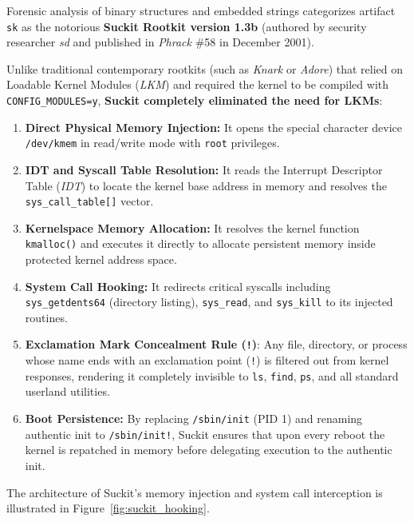 \begin{notaforense}
Forensic analysis of binary structures and embedded strings categorizes artifact \texttt{sk} as the notorious \textbf{Suckit Rootkit version 1.3b} (authored by security researcher \textit{sd} and published in \textit{Phrack} \#58 in December 2001).

Unlike traditional contemporary rootkits (such as \textit{Knark} or \textit{Adore}) that relied on Loadable Kernel Modules (\textit{LKM}) and required the kernel to be compiled with \texttt{CONFIG\_MODULES=y}, \textbf{Suckit completely eliminated the need for LKMs}:
\begin{enumerate}
    \item \textbf{Direct Physical Memory Injection:} It opens the special character device \texttt{/dev/kmem} in read/write mode with \texttt{root} privileges.
    \item \textbf{IDT and Syscall Table Resolution:} It reads the Interrupt Descriptor Table (\textit{IDT}) to locate the kernel base address in memory and resolves the \texttt{sys\_call\_table[]} vector.
    \item \textbf{Kernelspace Memory Allocation:} It resolves the kernel function \texttt{kmalloc()} and executes it directly to allocate persistent memory inside protected kernel address space.
    \item \textbf{System Call Hooking:} It redirects critical syscalls including \texttt{sys\_getdents64} (directory listing), \texttt{sys\_read}, and \texttt{sys\_kill} to its injected routines.
    \item \textbf{Exclamation Mark Concealment Rule (\texttt{!})}: Any file, directory, or process whose name ends with an exclamation point (\texttt{!}) is filtered out from kernel responses, rendering it completely invisible to \texttt{ls}, \texttt{find}, \texttt{ps}, and all standard userland utilities.
    \item \textbf{Boot Persistence:} By replacing \texttt{/sbin/init} (PID 1) and renaming authentic init to \texttt{/sbin/init!}, Suckit ensures that upon every reboot the kernel is repatched in memory before delegating execution to the authentic init.
\end{enumerate}
\end{notaforense}

The architecture of Suckit's memory injection and system call interception is illustrated in Figure~\ref{fig:suckit_hooking}.


